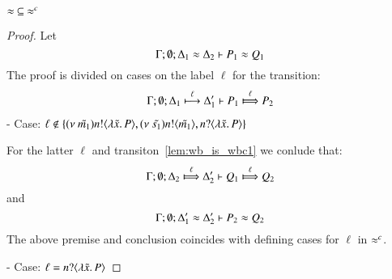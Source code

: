 
\begin{lemma}\rm
	\label{lem:wb_is_wbc}
	$\approx\ \subseteq\ \approx^{c}$
\end{lemma}

\begin{proof}
	Let
	\[
		\Gamma; \emptyset; \Delta_1 \approx \Delta_2 \vdash P_1 \approx Q_1
	\]
	The proof is divided on cases on the label $\ell$ for the transition:
%
	\begin{eqnarray}
		\Gamma; \es; \Delta_1 \hby{\ell} \Delta_1' \proves P_1 \Hby{\ell} P_2 \label{lem:wb_is_wbc1}
	\end{eqnarray}
%
	\noi - Case: $\ell \notin \{ (\nu\ \tilde{m_1}) n ! \langle \lambda \tilde{x}.\,P \rangle,  (\nu\ \tilde{s_1}) n ! \langle \tilde{m_1} \rangle, n ? \langle \lambda \tilde{x}.\,P \rangle \}$

	\noi For the latter $\ell$ and transiton~\ref{lem:wb_is_wbc1} we conlude that:	
%
	\[
		\Gamma; \es; \Delta_2 \Hby{\ell} \Delta_2' \proves Q_1 \Hby{\ell} Q_2
	\]
%
	\noi and
%
	\[
		\Gamma; \emptyset; \Delta_1' \approx \Delta_2' \vdash P_2 \approx Q_2
	\]
%
	The above premise and conclusion coincides with defining cases for $\ell$ in $\approx^{c}$.

	\noi - Case: $\ell = n ? \langle \lambda \tilde{x}.\,P \rangle$


\end{proof}
